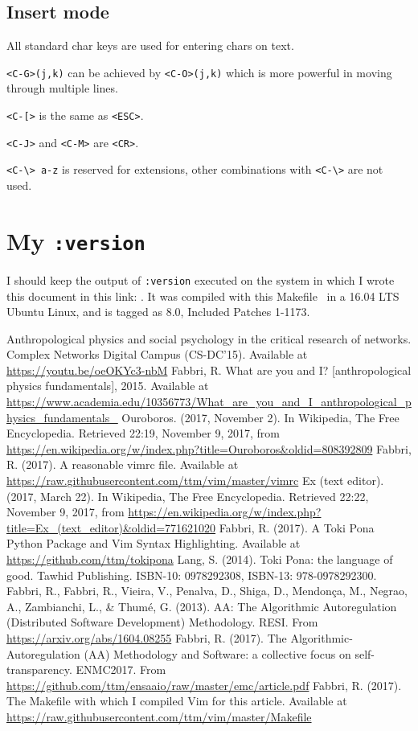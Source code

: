 \documentclass{article}
\newcommand{\ttt}[1] {
	\texttt{<#1>}}
\newcommand{\tttt}[1] {
	\texttt{#1}}
\begin{document}
\subsection{Insert mode}
All standard char keys are used for entering chars on text.
\tttt{<C-G>(j,k)} can be achieved by \tttt{<C-O>(j,k)} which is more powerful
in moving through multiple lines.
\ttt{C-[} is the same as \ttt{ESC}.
\ttt{C-J} and \ttt{C-M} are \ttt{CR}.
\tttt{<C-\textbackslash> a-z} is reserved for extensions,
other combinations with \ttt{C-\textbackslash} are not used.

\section{My \tttt{:version}}
I should keep the output of \tttt{:version} executed on the system
in which I wrote this document in this link:
\url{}.
It was compiled with this Makefile~\cite{makefile}
in a 16.04 LTS Ubuntu Linux,
and is tagged as 8.0, Included Patches 1-1173.

\begin{thebibliography}{99}
\fontsize{11}{0}\selectfont
{}
	Anthropological physics and social psychology in the critical research of networks. Complex Networks Digital Campus (CS-DC'15).
	Available at \url{https://youtu.be/oeOKYc3-nbM}
	Fabbri, R. What are you and I? [anthropological physics fundamentals], 2015. Available at \url{https://www.academia.edu/10356773/What_are_you_and_I_anthropological_physics_fundamentals_}
  Ouroboros. (2017, November 2). In Wikipedia, The Free Encyclopedia. Retrieved 22:19, November 9, 2017, from \url{https://en.wikipedia.org/w/index.php?title=Ouroboros&oldid=808392809}
	Fabbri, R. (2017). A reasonable vimrc file. Available at \url{https://raw.githubusercontent.com/ttm/vim/master/vimrc} 
  Ex (text editor). (2017, March 22). In Wikipedia, The Free Encyclopedia. Retrieved 22:22, November 9, 2017, from \url{https://en.wikipedia.org/w/index.php?title=Ex_(text_editor)&oldid=771621020}
	Fabbri, R. (2017). A Toki Pona Python Package and Vim Syntax Highlighting. Available at \url{https://github.com/ttm/tokipona} 
	Lang, S. (2014). Toki Pona: the language of good. Tawhid Publishing.
    ISBN-10: 0978292308, ISBN-13: 978-0978292300.
	Fabbri, R., Fabbri, R., Vieira, V., Penalva, D., Shiga, D., Mendonça, M., Negrao, A., Zambianchi, L., \& Thumé, G. (2013). AA: The Algorithmic Autoregulation (Distributed Software Development) Methodology. RESI. From \url{https://arxiv.org/abs/1604.08255}
	Fabbri, R. (2017).
The Algorithmic-Autoregulation (AA) Methodology and Software:
a collective focus on self-transparency. ENMC2017. From \url{https://github.com/ttm/ensaaio/raw/master/emc/article.pdf} 
	Fabbri, R. (2017). The Makefile with which I compiled Vim for this article. Available at \url{https://raw.githubusercontent.com/ttm/vim/master/Makefile} 
\end{thebibliography}
\end{document}
